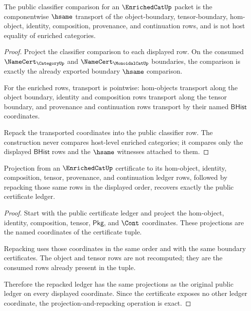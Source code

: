 \begin{theorem}\label{thm:enrichedcat-classifier-transport-obligation}
The public classifier comparison for an $\EnrichedCatUp$ packet is the
componentwise $\hsame$ transport of the object-boundary, tensor-boundary,
hom-object, identity, composition, provenance, and continuation rows, and is not
host equality of enriched categories.
\end{theorem}
\begin{proof}
Project the classifier comparison to each displayed row. On the consumed
$\NameCert_{\CategoryUp}$ and $\NameCert_{\MonoidalCatUp}$ boundaries, the
comparison is exactly the already exported boundary $\hsame$ comparison.

For the enriched rows, transport is pointwise: hom-objects transport along the
object boundary, identity and composition rows transport along the tensor
boundary, and provenance and continuation rows transport by their named
$\mathsf{BHist}$ coordinates.

Repack the transported coordinates into the public classifier row. The
construction never compares host-level enriched categories; it compares only the
displayed $\mathsf{BHist}$ rows and the $\hsame$ witnesses attached to them.
\end{proof}

\begin{theorem}\label{thm:enrichedcat-ledger-exactness-obligation}
Projection from an $\EnrichedCatUp$ certificate to its hom-object, identity,
composition, tensor, provenance, and continuation ledger rows, followed by
repacking those same rows in the displayed order, recovers exactly the public
certificate ledger.
\end{theorem}
\begin{proof}
Start with the public certificate ledger and project the hom-object, identity,
composition, tensor, $\mathsf{Pkg}$, and $\Cont$ coordinates. These projections
are the named coordinates of the certificate tuple.

Repacking uses those coordinates in the same order and with the same boundary
certificates. The object and tensor rows are not recomputed; they are the
consumed rows already present in the tuple.

Therefore the repacked ledger has the same projections as the original public
ledger on every displayed coordinate. Since the certificate exposes no other
ledger coordinate, the projection-and-repacking operation is exact.
\end{proof}

